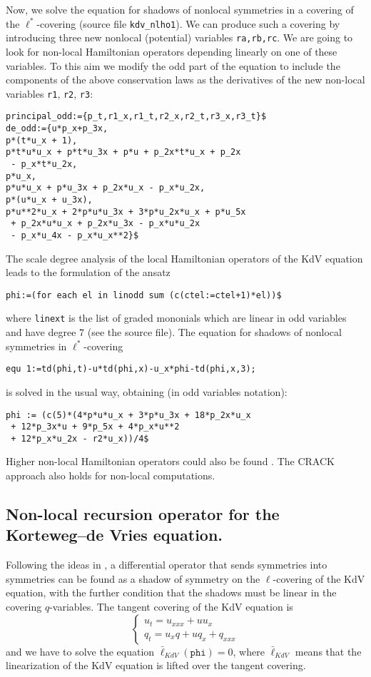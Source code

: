 Now, we solve the equation for shadows of nonlocal symmetries in a covering of
the $\ell^*$-covering (source file \texttt{kdv\_nlho1}). We can produce
such a covering by introducing three new nonlocal (potential) variables
\texttt{ra,rb,rc}. We are going to look for non-local Hamiltonian operators
depending linearly on one of these variables. To this aim we modify the odd
part of the equation to include the components of the above conservation laws
as the derivatives of the new non-local variables \texttt{r1}, \texttt{r2},
\texttt{r3}:
\begin{verbatim}
principal_odd:={p_t,r1_x,r1_t,r2_x,r2_t,r3_x,r3_t}$
de_odd:={u*p_x+p_3x,
p*(t*u_x + 1),
p*t*u*u_x + p*t*u_3x + p*u + p_2x*t*u_x + p_2x
 - p_x*t*u_2x,
p*u_x,
p*u*u_x + p*u_3x + p_2x*u_x - p_x*u_2x,
p*(u*u_x + u_3x),
p*u**2*u_x + 2*p*u*u_3x + 3*p*u_2x*u_x + p*u_5x
 + p_2x*u*u_x + p_2x*u_3x - p_x*u*u_2x
 - p_x*u_4x - p_x*u_x**2}$
\end{verbatim}
The scale degree analysis of the local Hamiltonian operators of the KdV
equation leads to the formulation of the ansatz
\begin{verbatim}
phi:=(for each el in linodd sum (c(ctel:=ctel+1)*el))$
\end{verbatim}
where \texttt{linext} is the list of graded mononials which are linear in odd
variables and have degree $7$ (see the source file).
The equation for shadows of nonlocal symmetries in $\ell^*$-covering
\begin{verbatim}
equ 1:=td(phi,t)-u*td(phi,x)-u_x*phi-td(phi,x,3);
\end{verbatim}
is solved in the usual way, obtaining (in odd variables notation):
\begin{verbatim}
phi := (c(5)*(4*p*u*u_x + 3*p*u_3x + 18*p_2x*u_x
 + 12*p_3x*u + 9*p_5x + 4*p_x*u**2
 + 12*p_x*u_2x - r2*u_x))/4$
\end{verbatim}
Higher non-local Hamiltonian operators could also be found
\cite{KerstenKrasilshchikVerboretsky:2004}. The CRACK approach also holds for non-local computations.


\subsection{Non-local recursion operator for the
  Korteweg--de Vries equation.}
\label{cdesec:korteweg-de-vries-2}
Following the ideas in \cite{KerstenKrasilshchikVerboretsky:2004}, a differential operator that sends
symmetries into symmetries can be found as a shadow of symmetry on the
$\ell$-covering of the KdV equation, with the further condition that the
shadows must be linear in the covering $q$-variables. The tangent covering of
the KdV equation is
\[
  \left\{\begin{array}{l}
    u_t=u_{xxx}+uu_x\\
    q_t=u_xq + uq_x + q_{xxx}
  \end{array}\right.
\]
and we have to solve the equation $\bar\ell_{KdV}(\mathtt{phi})=0$, where
$\bar\ell_{KdV}$ means that the linearization of the KdV equation is lifted
over the tangent covering.

